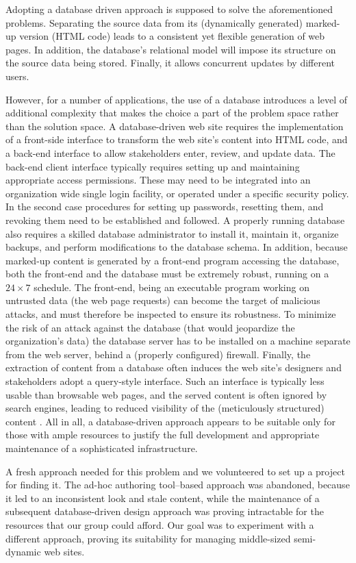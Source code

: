\documentclass[10pt]{article}
\begin{document}
Adopting a database driven approach is supposed to
solve the aforementioned problems.
Separating the source data from its (dynamically generated)
marked-up version (HTML code) leads to a consistent
yet flexible generation of web pages.
In addition, the database's relational model will impose
its structure on the source data being stored.
Finally, it allows concurrent updates by
different users.

However, for a number of applications, the use of a database
introduces a level of additional complexity that
makes the choice a part of
the problem space rather than the solution space.
A database-driven web site requires the implementation of a
front-side interface to transform the web site's content into
HTML code, and a back-end interface to allow stakeholders
enter, review, and update data.
The back-end client interface typically requires setting up
and maintaining appropriate access permissions.
These may need to be integrated into an organization wide single
login facility, or operated under a specific security policy.
In the second case procedures for setting up passwords,
resetting them, and revoking them need to be established and followed.
A properly running database also requires a skilled database
administrator to install it, maintain it, organize backups,
and perform modifications to the database schema.
In addition, because marked-up content is generated by a front-end
program accessing the database, both the front-end and the database
must be extremely robust, running on a $24 \times 7$ schedule.
The front-end, being an executable program working on
untrusted data (the web page requests) can become the target of
malicious attacks,
and must therefore be inspected to ensure its robustness.
To minimize the risk of an attack against the database
(that would jeopardize the organization's data)
the database server has to be installed on a machine separate
from the web server, behind a (properly configured) firewall.
Finally, the extraction of content from a database often
induces the web site's designers and stakeholders adopt a
query-style interface.
Such an interface is typically less usable than browsable web pages,
and the served content is often ignored by search engines,
leading to reduced visibility
of the (meticulously structured) content \cite{DEEP_WEB}.
All in all, a database-driven approach appears to be suitable
only for those with ample resources to justify the full
development and appropriate maintenance of a sophisticated infrastructure.

A fresh approach needed for this problem and we volunteered to 
set up a project for finding it.
The ad-hoc authoring tool--based approach was abandoned,
because it led to an inconsistent look and stale content,
while the maintenance of a subsequent database-driven
design approach was proving intractable for the resources that
our group could afford.
Our goal was to experiment with a different approach,
proving its suitability for managing middle-sized semi-dynamic
web sites.
\end{document}

